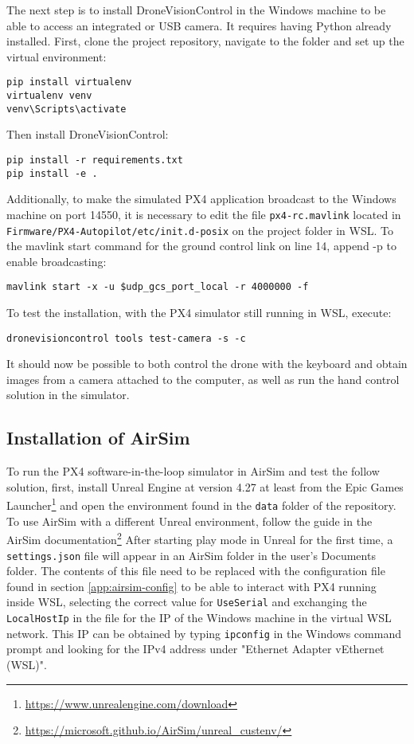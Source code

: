 The next step is to install DroneVisionControl in the Windows machine to be able to access an integrated or USB camera.
It requires having Python already installed.
First, clone the project repository, navigate to the folder and set up the virtual environment:
\begin{verbatim}
pip install virtualenv
virtualenv venv
venv\Scripts\activate
\end{verbatim}

Then install DroneVisionControl:
\begin{verbatim}
pip install -r requirements.txt
pip install -e .
\end{verbatim}

Additionally, to make the simulated PX4 application broadcast to the Windows machine on port 14550, it is necessary to edit the file \texttt{px4-rc.mavlink} located in \texttt{Firmware/PX4-Autopilot/etc/init.d-posix} on the project folder in WSL.
To the mavlink start command for the ground control link on line 14, append -p to enable broadcasting:
\begin{verbatim}
mavlink start -x -u $udp_gcs_port_local -r 4000000 -f
\end{verbatim}

To test the installation, with the PX4 simulator still running in WSL, execute:
\begin{verbatim}
dronevisioncontrol tools test-camera -s -c
\end{verbatim}
It should now be possible to both control the drone with the keyboard and obtain images from a camera attached to the computer, as well as run the hand control solution in the simulator.

\subsection{Installation of AirSim}
\label{app:install-airsim}

To run the PX4 software-in-the-loop simulator in AirSim and test the follow solution,
first, install Unreal Engine at version 4.27 at least from the Epic Games Launcher\footnote{\url{https://www.unrealengine.com/download}} and open the environment found in the \texttt{data} folder of the repository.
To use AirSim with a different Unreal environment, follow the guide in the AirSim documentation\footnote{\url{https://microsoft.github.io/AirSim/unreal_custenv/}}
After starting play mode in Unreal for the first time, a \texttt{settings.json} file will appear in an AirSim folder in the user's Documents folder.
The contents of this file need to be replaced with the configuration file found in section \ref{app:airsim-config} to be able to interact with PX4 running inside WSL, selecting the correct value for \texttt{UseSerial} and exchanging the \texttt{LocalHostIp} in the file for the IP of the Windows machine in the virtual WSL network.
This IP can be obtained by typing \texttt{ipconfig} in the Windows command prompt and looking for the IPv4 address under "Ethernet Adapter vEthernet (WSL)".

